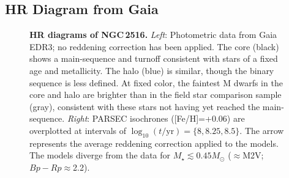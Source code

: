 \documentclass[12pt,twocolumn,tighten]{aastex63}
\begin{document}
\subsection{HR Diagram from Gaia}
\label{subsec:hr}

\begin{figure}[t]
	\begin{center}
		\leavevmode
	\end{center}
	\vspace{-0.7cm}
  \caption{ {\bf HR diagrams of NGC\,2516.}
    {\it Left}: Photometric data from Gaia EDR3; no reddening correction
    has been applied.  The core (black) shows a main-sequence and
    turnoff consistent with stars of a fixed age and metallicity.  The
    halo (blue) is similar, though the binary sequence is less
    defined.  At fixed color, the faintest M dwarfs in the core and
    halo are brighter than in the field star comparison sample (gray),
    consistent with these stars not having yet reached the
    main-sequence.
    {\it Right}: PARSEC isochrones ([Fe/H]=+0.06) are overplotted
    at intervals of $\log_{10}(t/\mathrm{yr})=\{8, 8.25, 8.5\}$.
    The arrow represents the average reddening correction applied
    to the models.
     The models diverge
    from the data for $M_\star \lesssim 0.45M_\odot$ ($\approx$M2V;
    $Bp-Rp\approx$2.2).
    \label{fig:hr}
  }
\end{figure}
\end{document}
